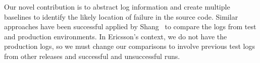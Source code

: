 


Our novel contribution is to abstract log information and create multiple
baselines to identify the likely location of failure in the source code.
Similar approaches have been successful applied by Shang~\cite{} to compare the
logs from test and production environments. In Ericsson's context, we do not
have the production logs, so we must change our comparisons to involve previous
test logs from other releases and successful and unsuccessful runs. 


